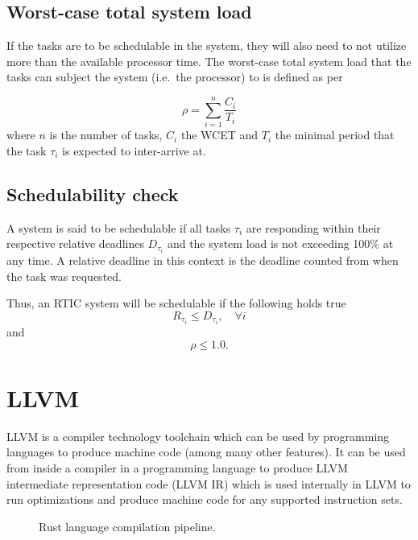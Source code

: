 \subsection{Worst-case total system load}
If the tasks are to be schedulable in the system, they will also need to not
utilize more than the available processor time. The worst-case total system
load that the tasks can subject the system (i.e.\ the processor) to is defined
as per~\cite{hardrealtimecomputingsystems}

\begin{equation}
    \rho = \sum^{n}_{i=1} \frac{C_i}{T_i}
\end{equation}
where $n$ is the number of tasks, $C_i$ the WCET and $T_i$ the
minimal period that the task $\tau_i$ is expected to inter-arrive at.

\subsection{Schedulability check}
A system is said to be schedulable if all tasks $\tau_i$ are responding within
their respective relative deadlines $D_{\tau_i}$ and the system load is not exceeding
100\% at any time. A relative deadline in this context is the deadline counted
from when the task was requested.

Thus, an RTIC system will be schedulable if the following holds true
\begin{equation}
    R_{\tau_i} \leq D_{\tau_i}, \quad \forall i
\end{equation}
and
\begin{equation}
    \rho \leq 1.0.
\end{equation}


\section{LLVM}
LLVM is a compiler technology toolchain which can be used by programming
languages to produce machine code (among many other features). It can be used
from inside a compiler in a programming language to produce LLVM intermediate
representation code (LLVM IR) which is used internally in LLVM to run
optimizations and produce machine code for any supported instruction sets.

\begin{figure}[h]
    \centering
    \caption{Rust language compilation pipeline.}
    \label{figure:rustcompilation}
\end{figure}

